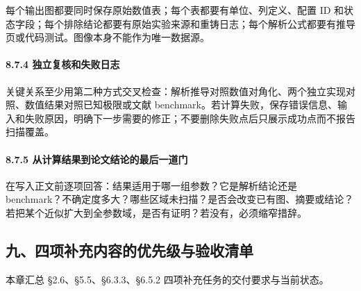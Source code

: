 \documentclass[
  chinese,
  UTF8]{ctexart}
\begin{document}
每个输出图都要同时保存原始数值表；每个表都要有单位、列定义、配置 ID
和状态字段；每个排除结论都要有原始实验来源和重铸日志；每个解析公式都要有推导页或代码测试。图像本身不能作为唯一数据源。

\paragraph{8.7.4
独立复核和失败日志}\label{ux72ecux7acbux590dux6838ux548cux5931ux8d25ux65e5ux5fd7}

关键关系至少用第二种方式交叉检查：解析推导对照数值对角化、两个独立实现对照、数值结果对照已知极限或文献
benchmark。若计算失败，保存错误信息、输入和失败原因，明确下一步需要的修正；不要删除失败点后只展示成功点而不报告扫描覆盖。

\paragraph{8.7.5
从计算结果到论文结论的最后一道门}\label{ux4eceux8ba1ux7b97ux7ed3ux679cux5230ux8bbaux6587ux7ed3ux8bbaux7684ux6700ux540eux4e00ux9053ux95e8}

在写入正文前逐项回答：结果适用于哪一组参数？它是解析结论还是
benchmark？不确定度多大？哪些区域未扫描？是否会改变已有图、摘要或结论？若把某个近似扩大到全参数域，是否有证明？若没有，必须缩窄措辞。

\subsection{九、四项补充内容的优先级与验收清单}\label{ux4e5dux56dbux9879ux8865ux5145ux5185ux5bb9ux7684ux4f18ux5148ux7ea7ux4e0eux9a8cux6536ux6e05ux5355}

本章汇总 §2.6、§5.5、§6.3.3、§6.5.2 四项补充任务的交付要求与当前状态。
\end{document}
